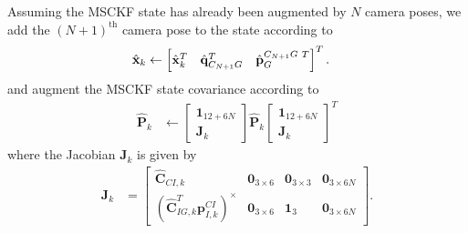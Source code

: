 \documentclass[letterpaper, 10 pt, conference]{ieeeconf}  %
\def\Vec#1{\mathbf{#1}}
\newcommand{\bbm}{\begin{bmatrix}}
\newcommand{\ebm}{\end{bmatrix}}
\begin{document}
Assuming the MSCKF state has already been augmented by $N$ camera poses, we add the $\left(N+1\right)^\text{th}$ camera pose to the state according to
\begin{align}
    \hat{\Vec{x}}_k &\leftarrow \bbm \hat{\Vec{x}}_k^T & \hat{\Vec{q}}_{C_{N+1} G}^T & \hat{\Vec{p}}_G^{C_{N+1} G \hspace{0.3em} T} \ebm^T .
\end{align}
and augment the MSCKF state covariance according to
\begin{align}
    \hat{\Vec{P}}_k &\leftarrow \bbm \Vec{1}_{12+6N} \\ \Vec{J}_k \ebm \hat{\Vec{P}}_k \bbm \Vec{1}_{12+6N} \\ \Vec{J}_k \ebm^T
\end{align}
where the Jacobian $\Vec{J}_k$ is given by
\begin{align}
\Vec{J}_k &= \bbm \hat{\Vec{C}}_{C I, k} & \Vec{0}_{3\times6} & \Vec{0}_{3\times3} & \Vec{0}_{3\times6N} \\
                            \left(\hat{\Vec{C}}_{I G, k}^T \Vec{p}_{I,k}^{CI}\right)^\times & \Vec{0}_{3\times6} & \Vec{1}_3 & \Vec{0}_{3\times6N}
                \ebm .
\end{align}
\end{document}
